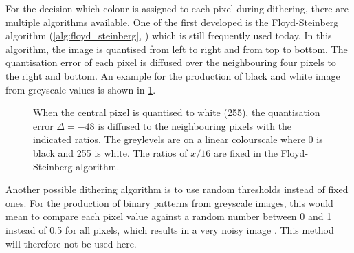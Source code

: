 %
For the decision which colour is assigned to each pixel during dithering, there are multiple algorithms available. One of the first developed is the Floyd-Steinberg algorithm (\cref{alg:floyd_steinberg}, \cite{floydsteinberg:1976}) which is still frequently used today. In this algorithm, the image is quantised from left to right and from top to bottom. The quantisation error of each pixel is diffused over the neighbouring four pixels to the right and bottom. An example for the production of black and white image from greyscale values is shown in \cref{fig:floyd_steinberg}.
\begin{figure}[htbp]
    \centering
    
    \caption[Example for the application of the Floyd-Steinberg error diffusion algorithm]{When the central pixel is quantised to white (255), the quantisation error $\Delta=-48$ is diffused to the neighbouring pixels with the indicated ratios. The greylevels are on a linear colourscale where 0 is black and 255 is white. The ratios of $x/16$ are fixed in the Floyd-Steinberg algorithm.}
    \label{fig:floyd_steinberg}
\end{figure}

Another possible dithering algorithm is to use random thresholds instead of fixed ones. For the production of binary patterns from greyscale images, this would mean to compare each pixel value against a random number between 0 and 1 instead of \num{0.5} for all pixels, which results in a very noisy image \cite{funkhouser:2000}. This method will therefore not be used here.

